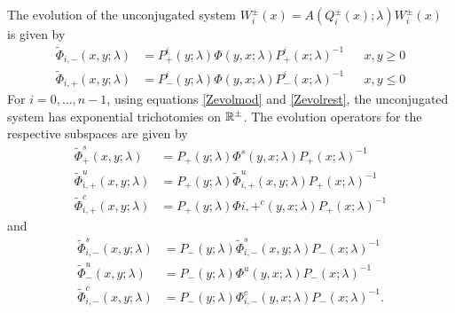 \documentclass[thesis.tex]{subfiles}
\begin{document}
The evolution of the unconjugated system $W_i^\pm(x) = A(Q_i^\pm(x); \lambda) W_i^\pm(x)$ is given by
\begin{equation}\label{unconjevol2}
\begin{aligned}
\tilde{\Phi}_{i,-}(x, y; \lambda) &= P^i_+(y; \lambda) \Phi(y, x; \lambda) P^i_+(x; \lambda)^{-1} && x, y \geq 0  \\
\tilde{\Phi}_{i,+}(x, y; \lambda) &= P^i_-(y; \lambda) \Phi(y, x; \lambda) P^i_-(x; \lambda)^{-1} && x, y \leq 0
\end{aligned}
\end{equation}
For $i = 0, \dots, n-1$, using equations \cref{Zevolmod} and \cref{Zevolrest}, the unconjugated system has exponential trichotomies on $\mathbb{R}^\pm$. The evolution operators for the respective subspaces are given by
\begin{equation}\label{trichunconjplus}
\begin{aligned}
\tilde{\Phi}_+^{s}(x, y; \lambda) &= P_+(y; \lambda) \Phi^{s}(y, x; \lambda) P_+(x; \lambda)^{-1} \\
\tilde{\Phi}_{i,+}^{u}(x, y; \lambda) &= P_+(y; \lambda) \tilde{\Phi}_{i,+}^{u}(x, y; \lambda) P_+(x; \lambda)^{-1} \\
\tilde{\Phi}_{i,+}^{c}(x, y; \lambda) &= P_+(y; \lambda) \Phi{i,+}^{c}(y, x; \lambda) P_+(x; \lambda)^{-1}
\end{aligned}
\end{equation}
and
\begin{equation}\label{trichunconjminus}
\begin{aligned}
\tilde{\Phi}_{i,-}^{s}(x, y; \lambda) &= P_-(y; \lambda) \tilde{\Phi}_{i,-}^{s}(x, y; \lambda) P_-(x; \lambda)^{-1} \\
\tilde{\Phi}_-^{u}(x, y; \lambda) &= P_-(y; \lambda) \Phi^{u}(y, x; \lambda) P_-(x; \lambda)^{-1} \\
\tilde{\Phi}_{i,-}^{c}(x, y; \lambda) &= P_-(y; \lambda) \Phi_{i,-}^{c}(y, x; \lambda) P_-(x; \lambda)^{-1}.
\end{aligned}
\end{equation}
\end{document}

